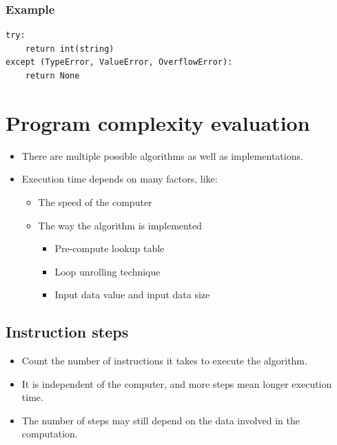 \documentclass[11pt]{article}
\begin{document}
\subsubsection{Example}
\label{sec:org5e09d05}
\begin{verbatim}
try:
    return int(string)
except (TypeError, ValueError, OverflowError):
    return None
\end{verbatim}

 \newpage

\section{Program complexity evaluation}
\label{sec:org155ec90}
\begin{itemize}
\item There are multiple possible algorithms as well as implementations.
\item Execution time depends on many factors, like:
\begin{itemize}
\item The speed of the computer
\item The way the algorithm is implemented
\begin{itemize}
\item Pre-compute lookup table
\item Loop unrolling technique
\item Input data value and input data size
\end{itemize}
\end{itemize}
\end{itemize}

\subsection{Instruction steps}
\label{sec:org6f7d871}
\begin{itemize}
\item Count the number of instructions it takes to execute the algorithm.
\item It is independent of the computer, and more steps mean longer execution time.
\item The number of steps may still depend on the data involved in the computation.
\end{itemize}
\end{document}
